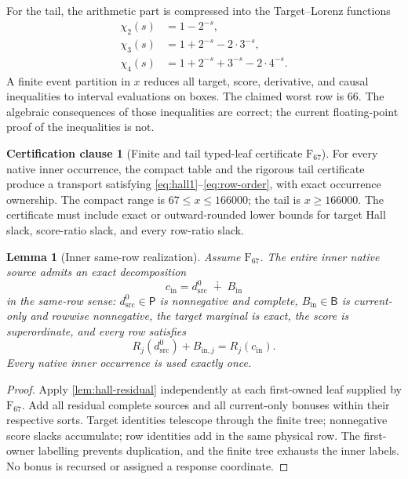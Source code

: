 \documentclass[11pt]{article}
\newtheorem{lemma}[theorem]{Lemma}
\theoremstyle{definition}
\newtheorem{assumption}[theorem]{Certification clause}
\theoremstyle{remark}
\newcommand{\1}{\mathbf 1}
\newcommand{\Src}{\mathsf P}
\newcommand{\Bonus}{\mathsf B}
\begin{document}
For the tail, the arithmetic part is compressed into the Target--Lorenz functions
\begin{align}
\chi_2(s)&=1-2^{-s},\label{eq:chi2}\\
\chi_3(s)&=1+2^{-s}-2\cdot3^{-s},\label{eq:chi3}\\
\chi_4(s)&=1+2^{-s}+3^{-s}-2\cdot4^{-s}.
\end{align}
A finite event partition in \(x\) reduces all target, score, derivative, and causal inequalities to interval evaluations on boxes.  The claimed worst row is \(66\).  The algebraic consequences of those inequalities are correct; the current floating-point proof of the inequalities is not.

\begin{assumption}[Finite and tail typed-leaf certificate \(\mathrm F_{67}\)]\label{ass:F67}
For every native inner occurrence, the compact table and the rigorous tail certificate produce a transport satisfying \eqref{eq:hall1}--\eqref{eq:row-order}, with exact occurrence ownership.  The compact range is \(67\le x\le166000\); the tail is \(x\ge166000\).  The certificate must include exact or outward-rounded lower bounds for target Hall slack, score-ratio slack, and every row-ratio slack.
\end{assumption}

\begin{lemma}[Inner same-row realization]\label{lem:inner-realization}
Assume \(\mathrm F_{67}\).  The entire inner native source admits an exact decomposition
\begin{equation}\label{eq:inner-decomp}
c_{\mathrm{in}}=d_{\mathrm{src}}^0\;\dotplus\;B_{\mathrm{in}}
\end{equation}
in the same-row sense: \(d_{\mathrm{src}}^0\in\Src\) is nonnegative and complete, \(B_{\mathrm{in}}\in\Bonus\) is current-only and rowwise nonnegative, the target marginal is exact, the score is superordinate, and every row satisfies
\begin{equation}\label{eq:inner-row-exact}
R_j(d_{\mathrm{src}}^0)+B_{\mathrm{in},j}=R_j(c_{\mathrm{in}}).
\end{equation}
Every native inner occurrence is used exactly once.
\end{lemma}

\begin{proof}
Apply \cref{lem:hall-residual} independently at each first-owned leaf supplied by \(\mathrm F_{67}\).  Add all residual complete sources and all current-only bonuses within their respective sorts.  Target identities telescope through the finite tree; nonnegative score slacks accumulate; row identities add in the same physical row.  The first-owner labelling prevents duplication, and the finite tree exhausts the inner labels.  No bonus is recursed or assigned a response coordinate.
\end{proof}
\end{document}
